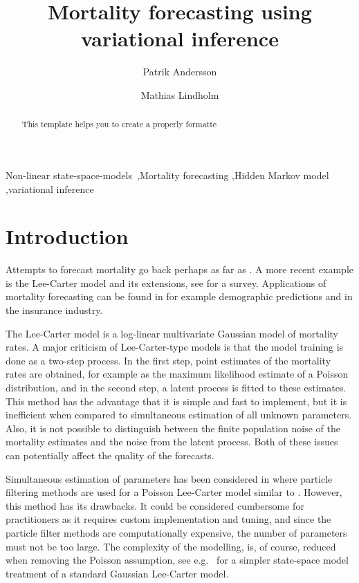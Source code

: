 \documentclass[preprint,12pt]{elsarticle}
\begin{document}
\begin{frontmatter}

\title{Mortality forecasting using variational inference}
\author{Patrik Andersson}
\address{Uppsala University}
\author{Mathias Lindholm}
\address{Stockholm University}

\begin{abstract}
This template helps you to create a properly formatte
\end{abstract}

\begin{keyword}
Non-linear state-space-models \sep Mortality forecasting \sep Hidden Markov model \sep variational inference
\end{keyword}

\end{frontmatter}

\linenumbers

\section{Introduction}
Attempts to forecast mortality go back perhaps as far as \cite{gompertz1825nature}. A more recent example is the Lee-Carter model \citep{lee1992modeling} and its extensions, see \cite{booth2008mortality, haberman2011comparative, carfora2017quantitative} for a survey. Applications of mortality forecasting can be found in for example demographic predictions and in the insurance industry.

The Lee-Carter model is a log-linear multivariate Gaussian model of mortality rates. A major criticism of Lee-Carter-type models is that the model training is done as a two-step process. In the first step, point estimates of the mortality rates are obtained, for example as the maximum likelihood estimate of a Poisson distribution, and in the second step, a latent process is fitted to these estimates. This method has the advantage that it is simple and fast to implement, but it is inefficient when compared to simultaneous estimation of all unknown parameters. Also, it is not possible to distinguish between the finite population noise of the mortality estimates and the noise from the latent process. Both of these issues can potentially affect the quality of the forecasts. 

Simultaneous estimation of parameters has been considered in \cite{andersson2020mortality} where particle filtering methods are used for a Poisson Lee-Carter model similar to \cite{brouhns2002poisson}. However, this method has its drawbacks. It could be considered cumbersome for practitioners as it requires custom implementation and tuning, and since the particle filter methods are computationally expensive, the number of parameters must not be too large. The complexity of the modelling, is, of course, reduced when removing the Poisson assumption, see e.g.\ \cite{de2006extending} for a simpler state-space model treatment of a standard Gaussian Lee-Carter model.
\end{document}
